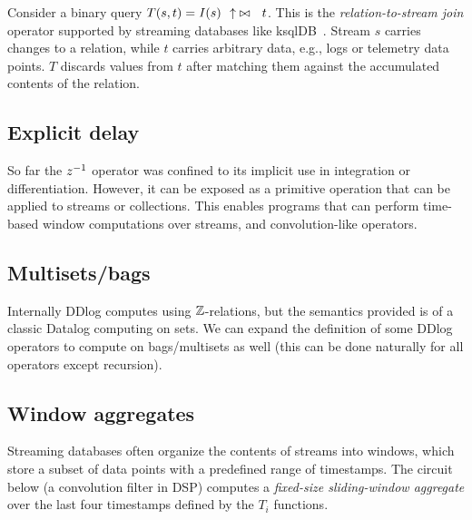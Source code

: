 Consider a binary query $T(s, t) = \mathit{I}(s)~~{\uparrow}\bowtie~~t$.  This is the
\emph{relation-to-stream join} operator supported by streaming databases like ksqlDB~\cite{jafarpour-edbt19}.
Stream $s$ carries changes to a relation, while $t$ carries arbitrary data, e.g., logs
or telemetry data points. $T$ discards values from $t$ after matching them against the accumulated contents of the relation.

\subsection{Explicit delay}

So far the $z^{-1}$ operator was confined to its implicit use in integration or
differentiation.  However, it can be exposed as a primitive operation that
can be applied to streams or collections.  This enables programs that can
perform time-based window computations over streams, and convolution-like
operators.  


\subsection{Multisets/bags}

Internally DDlog computes using $\mathbb{Z}$-relations, but the semantics provided
is of a classic Datalog computing on sets.  We can expand the definition
of some DDlog operators to compute on bags/multisets as well (this can be 
done naturally for all operators except recursion).


\subsection{Window aggregates}

Streaming databases often organize the contents of streams into windows, 
which store a subset of data points with a predefined range of timestamps.
The circuit below (a convolution filter in DSP) computes a \emph{fixed-size sliding-window aggregate}
over the last four timestamps defined by the $T_i$ functions.

\begin{center}
\end{center}

